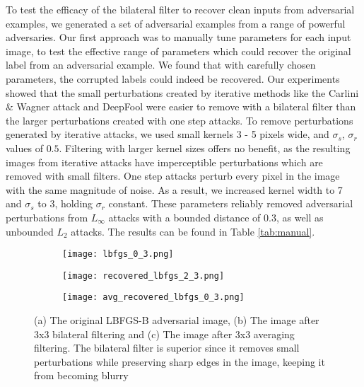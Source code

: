 \documentclass{article} %
\begin{document}
To test the efficacy of the bilateral filter to recover clean inputs from adversarial examples, we generated a set of adversarial examples from a range of powerful adversaries. Our first approach was to manually tune parameters for each input image, to test the effective range of parameters which could recover the original label from an adversarial example. We found that with carefully chosen parameters, the corrupted labels could indeed be recovered. Our experiments showed that the small perturbations created by iterative methods like the Carlini \& Wagner attack and DeepFool were easier to remove with a bilateral filter than the larger perturbations created with one step attacks. To remove perturbations generated by iterative attacks, we used small kernels 3 - 5 pixels wide, and $\sigma_s$, $\sigma_r$ values of $0.5$. Filtering with larger kernel sizes offers no benefit, as the resulting images from iterative attacks have imperceptible perturbations which are removed with small filters. One step attacks perturb every pixel in the image with the same magnitude of noise. As a result, we increased kernel width to 7 and $\sigma_s$ to 3, holding $\sigma_r$ constant. These parameters reliably removed adversarial perturbations from $L_\infty$ attacks with a bounded distance of 0.3, as well as unbounded $L_2$ attacks. The results can be found in Table \ref{tab:manual}.

\begin{figure}[!ht]
\vskip -0.05in
\centering
\begin{subfigure}{.3\textwidth}
  \centering
  \texttt{[image: lbfgs\_0\_3.png]}
  \caption{}
\end{subfigure}%
\begin{subfigure}{.3\textwidth}
  \centering
  \texttt{[image: recovered\_lbfgs\_2\_3.png]}
  \caption{}
\end{subfigure}
\begin{subfigure}{.3\textwidth}
  \centering
  \texttt{[image: avg\_recovered\_lbfgs\_0\_3.png]}
  \caption{}
\end{subfigure}
\vskip -0.05in
\caption{ (a) The original LBFGS-B adversarial image, (b) The image after 3x3 bilateral filtering and (c) The image after 3x3 averaging filtering. The bilateral filter is superior since it removes small perturbations while preserving sharp edges in the image, keeping it from becoming blurry}
\label{fig:test}
\vskip -0.1in
\end{figure}
\end{document}
